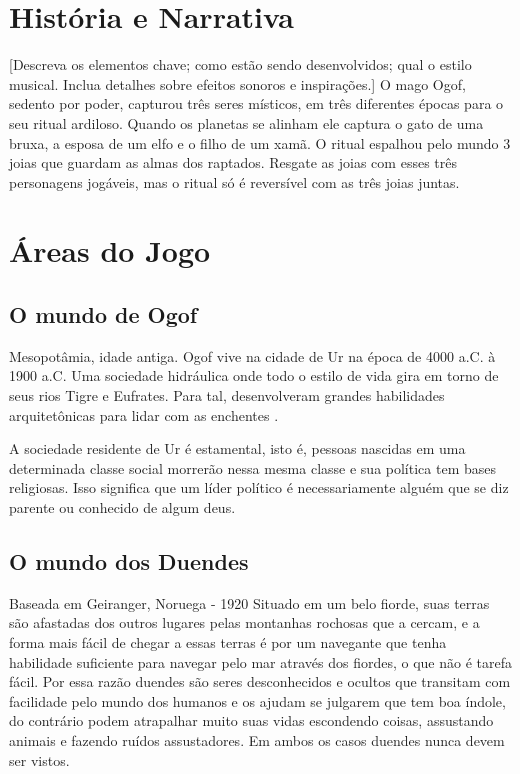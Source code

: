 
\section{História e Narrativa}

[Descreva os elementos chave; como estão sendo desenvolvidos; qual o estilo musical. Inclua detalhes sobre efeitos sonoros e inspirações.]
O mago Ogof, sedento por poder, capturou três seres místicos, em três diferentes épocas para o seu ritual ardiloso. Quando os planetas se alinham ele captura o gato de uma bruxa, a esposa de um elfo e o filho de um xamã. O ritual espalhou pelo mundo 3 joias que guardam as almas dos raptados. Resgate as joias com esses três personagens jogáveis, mas o ritual só é reversível com as três joias juntas.

\section{Áreas do Jogo}

\subsection{O mundo de Ogof}
Mesopotâmia, idade antiga. Ogof vive na cidade de Ur na época de 4000 a.C. à 1900 a.C. Uma sociedade hidráulica onde todo o estilo de vida gira em torno de seus rios Tigre e Eufrates. Para tal, desenvolveram grandes habilidades arquitetônicas para lidar com as enchentes . 

A sociedade residente de Ur é estamental, isto é, pessoas nascidas em uma determinada classe social morrerão nessa mesma classe e sua política tem bases religiosas. Isso significa que um líder político é necessariamente alguém que se diz parente ou conhecido de algum deus.

\subsection{O mundo dos Duendes}
Baseada em Geiranger, Noruega - 1920
Situado em um belo fiorde, suas terras são afastadas dos outros lugares pelas montanhas rochosas que a cercam, e a forma mais fácil de chegar a essas terras é por um navegante que tenha habilidade suficiente para navegar pelo mar através dos
fiordes, o que não é tarefa fácil. Por essa razão duendes são seres desconhecidos e ocultos que transitam com facilidade pelo mundo dos humanos e os ajudam se julgarem que tem boa índole, do contrário podem atrapalhar muito suas vidas escondendo coisas, assustando animais e fazendo ruídos assustadores. Em ambos os casos duendes nunca devem ser vistos.


